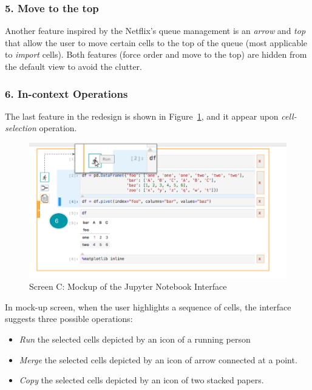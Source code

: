 \documentclass[12pt,letterpaper]{article}
\begin{document}
\subsubsection*{5. Move to the top}
Another feature inspired by the Netflix's queue management is an \textit{arrow} and \textit{top} that allow the user to move certain cells to the top of the queue (most applicable to \textit{import} cells). Both features (force order and move to the top) are hidden from the default view to avoid the clutter.


\subsubsection*{6. In-context Operations}
The last feature in the redesign is shown in Figure~\ref{fig::6}, and it appear upon \textit{cell-selection} operation. 

\begin{figure}[hbt!]
\centering
\includegraphics[scale=.35]{figures/project-principles/jupyter_mock_screen_c.png}
\caption{Screen C: Mockup of the Jupyter Notebook Interface}
\label{fig::6}
\end{figure}

In mock-up screen, when the user highlights a sequence of cells, the interface suggests three possible operations:

\begin{itemize}
\itemsep0em 
    \item \textit{Run} the selected cells depicted by an icon of a running person
    \item \textit{Merge} the selected cells depicted by an icon of arrow connected at a point.
    \item \textit{Copy} the selected cells depicted by an icon of two stacked papers.
\end{itemize}
\end{document}
